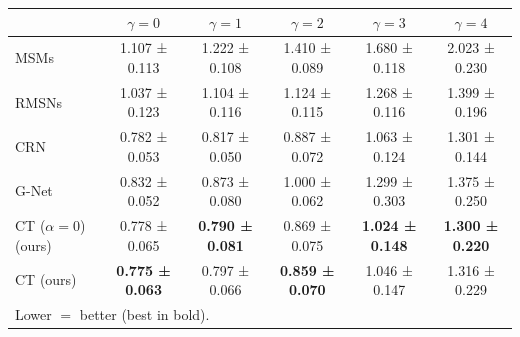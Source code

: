 \begin{tabular}{l|ccccc}
\toprule
{} &            $\gamma = 0$ &            $\gamma = 1$ &            $\gamma = 2$ &            $\gamma = 3$ &            $\gamma = 4$ \\
\midrule
MSMs                      &           1.107 ± 0.113 &           1.222 ± 0.108 &           1.410 ± 0.089 &           1.680 ± 0.118 &           2.023 ± 0.230 \\
RMSNs                     &           1.037 ± 0.123 &           1.104 ± 0.116 &           1.124 ± 0.115 &           1.268 ± 0.116 &           1.399 ± 0.196 \\
CRN                      &           0.782 ± 0.053 &           0.817 ± 0.050 &           0.887 ± 0.072 &           1.063 ± 0.124 &           1.301 ± 0.144 \\
G-Net                    &           0.832 ± 0.052 &           0.873 ± 0.080 &           1.000 ± 0.062 &           1.299 ± 0.303 &           1.375 ± 0.250 \\
\midrule
CT ($\alpha = 0$) (ours) &           0.778 ± 0.065 &  \textbf{0.790 ± 0.081} &           0.869 ± 0.075 &  \textbf{1.024 ± 0.148} &  \textbf{1.300 ± 0.220} \\
CT (ours)                &  \textbf{0.775 ± 0.063} &           0.797 ± 0.066 &  \textbf{0.859 ± 0.070} &           1.046 ± 0.147 &           1.316 ± 0.229 \\
\bottomrule
\multicolumn{6}{l}{Lower $=$ better (best in bold). }
\end{tabular}
